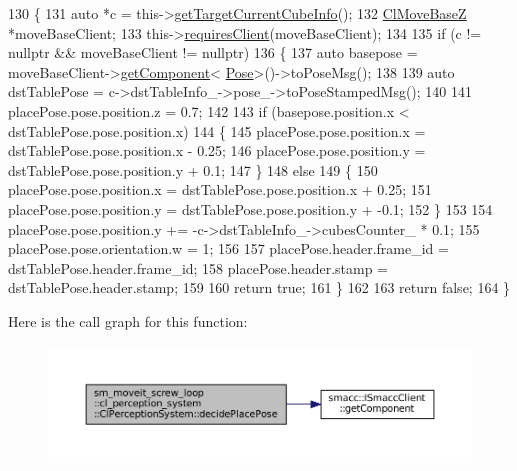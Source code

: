 \begin{DoxyCode}
130             \{
131                 \textcolor{keyword}{auto} *c = this->\hyperlink{classsm__moveit__screw__loop_1_1cl__perception__system_1_1ClPerceptionSystem_ad9231b87b9592cc5c847ce1b92a75446}{getTargetCurrentCubeInfo}();
132                 \hyperlink{classcl__move__base__z_1_1ClMoveBaseZ}{ClMoveBaseZ} *moveBaseClient;
133                 this->\hyperlink{classsmacc_1_1ISmaccClient_a7a9990a2f3e35d547671188d69fee520}{requiresClient}(moveBaseClient);
134 
135                 \textcolor{keywordflow}{if} (c != \textcolor{keyword}{nullptr} && moveBaseClient != \textcolor{keyword}{nullptr})
136                 \{
137                     \textcolor{keyword}{auto} basepose = moveBaseClient->\hyperlink{classsmacc_1_1ISmaccClient_adef78db601749ca63c19e74a27cb88cc}{getComponent}<
      \hyperlink{classcl__move__base__z_1_1Pose}{Pose}>()->toPoseMsg();
138 
139                     \textcolor{keyword}{auto} dstTablePose = c->dstTableInfo\_->pose\_->toPoseStampedMsg();
140 
141                     placePose.pose.position.z = 0.7;
142 
143                     \textcolor{keywordflow}{if} (basepose.position.x < dstTablePose.pose.position.x)
144                     \{
145                         placePose.pose.position.x = dstTablePose.pose.position.x - 0.25;
146                         placePose.pose.position.y = dstTablePose.pose.position.y + 0.1;
147                     \}
148                     \textcolor{keywordflow}{else}
149                     \{
150                         placePose.pose.position.x = dstTablePose.pose.position.x + 0.25;
151                         placePose.pose.position.y = dstTablePose.pose.position.y + -0.1;
152                     \}
153 
154                     placePose.pose.position.y += -c->dstTableInfo\_->cubesCounter\_ * 0.1;
155                     placePose.pose.orientation.w = 1;
156 
157                     placePose.header.frame\_id = dstTablePose.header.frame\_id;
158                     placePose.header.stamp = dstTablePose.header.stamp;
159 
160                     \textcolor{keywordflow}{return} \textcolor{keyword}{true};
161                 \}
162 
163                 \textcolor{keywordflow}{return} \textcolor{keyword}{false};
164             \}
\end{DoxyCode}
Here is the call graph for this function\+:
\nopagebreak
\begin{figure}[H]
\begin{center}
\leavevmode
\includegraphics[width=350pt]{classsm__moveit__screw__loop_1_1cl__perception__system_1_1ClPerceptionSystem_a9157b898cd0b4004cf3d9144f7c1d163_cgraph}
\end{center}
\end{figure}
